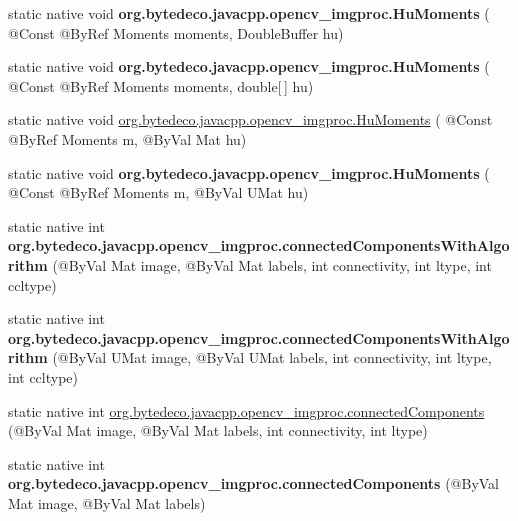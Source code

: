 \begin{DoxyCompactItemize}
\mbox{\label{group__imgproc__shape_ga1ebf2fbe5589d86cd6b582b4c1b0099f}} 
static native void {\bfseries org.\+bytedeco.\+javacpp.\+opencv\+\_\+imgproc.\+Hu\+Moments} ( @Const @By\+Ref Moments moments, Double\+Buffer hu)
\item 
\mbox{\label{group__imgproc__shape_gaf04e38d3d23a62bbdbf314e5cb12d696}} 
static native void {\bfseries org.\+bytedeco.\+javacpp.\+opencv\+\_\+imgproc.\+Hu\+Moments} ( @Const @By\+Ref Moments moments, double\mbox{[}$\,$\mbox{]} hu)
\item 
static native void \hyperlink{group__imgproc__shape_gab567ad055b6ac17d75b8f78044f7c2d4}{org.\+bytedeco.\+javacpp.\+opencv\+\_\+imgproc.\+Hu\+Moments} ( @Const @By\+Ref Moments m, @By\+Val Mat hu)
\item 
\mbox{\label{group__imgproc__shape_ga82b6c9f75c3cfd7c3bfb8d5c676c2912}} 
static native void {\bfseries org.\+bytedeco.\+javacpp.\+opencv\+\_\+imgproc.\+Hu\+Moments} ( @Const @By\+Ref Moments m, @By\+Val U\+Mat hu)
\item 
\mbox{\label{group__imgproc__shape_ga4e8ed08a584f1336f7dc27480b84e59c}} 
static native int {\bfseries org.\+bytedeco.\+javacpp.\+opencv\+\_\+imgproc.\+connected\+Components\+With\+Algorithm} (@By\+Val Mat image, @By\+Val Mat labels, int connectivity, int ltype, int ccltype)
\item 
\mbox{\label{group__imgproc__shape_ga5ff9117322f7e9a06bd574b4e7ccaca3}} 
static native int {\bfseries org.\+bytedeco.\+javacpp.\+opencv\+\_\+imgproc.\+connected\+Components\+With\+Algorithm} (@By\+Val U\+Mat image, @By\+Val U\+Mat labels, int connectivity, int ltype, int ccltype)
\item 
static native int \hyperlink{group__imgproc__shape_gad3b372e7de7a736c55ae6707238019cf}{org.\+bytedeco.\+javacpp.\+opencv\+\_\+imgproc.\+connected\+Components} (@By\+Val Mat image, @By\+Val Mat labels, int connectivity, int ltype)
\item 
\mbox{\label{group__imgproc__shape_gac4ef28d9919a94c3d6c03735cdc7ecf6}} 
static native int {\bfseries org.\+bytedeco.\+javacpp.\+opencv\+\_\+imgproc.\+connected\+Components} (@By\+Val Mat image, @By\+Val Mat labels)

\end{DoxyCompactItemize}
